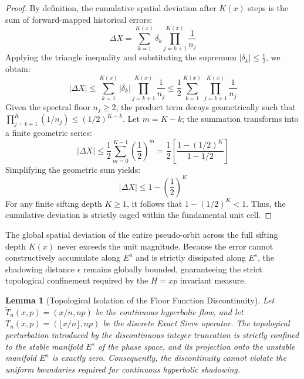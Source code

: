 \documentclass[sn-mathphys-num, pdflatex, referee]{sn-jnl}
\newtheorem{lemma}{Lemma}
\begin{document}
\begin{proof}
By definition, the cumulative spatial deviation after $K(x)$ steps is the sum of forward-mapped historical errors:
\begin{equation}
\Delta X = \sum_{k=1}^{K(x)} \delta_k \prod_{j=k+1}^{K(x)} \frac{1}{n_j}
\end{equation}
Applying the triangle inequality and substituting the supremum $|\delta_k| \le \frac{1}{2}$, we obtain:
\begin{equation}
|\Delta X| \le \sum_{k=1}^{K(x)} |\delta_k| \prod_{j=k+1}^{K(x)} \frac{1}{n_j} \le \frac{1}{2} \sum_{k=1}^{K(x)} \prod_{j=k+1}^{K(x)} \frac{1}{n_j}
\end{equation}
Given the spectral floor $n_j \ge 2$, the product term decays geometrically such that $\prod_{j=k+1}^{K} (1/n_j) \le (1/2)^{K-k}$. Let $m = K-k$; the summation transforms into a finite geometric series:
\begin{equation}
|\Delta X| \le \frac{1}{2} \sum_{m=0}^{K-1} \left( \frac{1}{2} \right)^m = \frac{1}{2} \left[ \frac{1 - (1/2)^K}{1 - 1/2} \right]
\end{equation}
Simplifying the geometric sum yields:
\begin{equation}
|\Delta X| \le 1 - \left( \frac{1}{2} \right)^K
\end{equation}
For any finite sifting depth $K \ge 1$, it follows that $1 - (1/2)^K < 1$. Thus, the cumulative deviation is strictly caged within the fundamental unit cell.
\end{proof}The global spatial deviation of the entire pseudo-orbit across the full sifting depth $K(x)$ never exceeds the unit magnitude. Because the error cannot constructively accumulate along $E^u$ and is strictly dissipated along $E^s$, the shadowing distance $\epsilon$ remains globally bounded, guaranteeing the strict topological confinement required by the $H=xp$ invariant measure.

\begin{lemma}[Topological Isolation of the Floor Function Discontinuity]
\label{lemma:discontinuity_isolation}
Let $\tilde{T}_n(x,p) = (x/n, np)$ be the continuous hyperbolic flow, and let $T_n(x,p) = (\lfloor x/n \rfloor, np)$ be the discrete Exact Sieve operator. The topological perturbation introduced by the discontinuous integer truncation is strictly confined to the stable manifold $E^s$ of the phase space, and its projection onto the unstable manifold $E^u$ is exactly zero. Consequently, the discontinuity cannot violate the uniform boundaries required for continuous hyperbolic shadowing.
\end{lemma}
\end{document}
